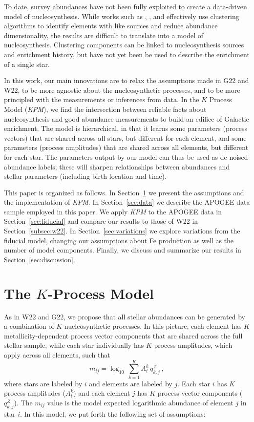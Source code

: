 \documentclass[modern]{aastex631}
\newcommand{\name}{\textsl{KPM}}
\begin{document}
To date, survey abundances have not been fully exploited to create a data-driven model of nucleosynthesis. While works such as \citet{ting2012}, \citet{casey2019}, and \citet{ratcliffe2022} effectively use clustering algorithms to identify elements with like sources and reduce abundance dimensionality, the results are difficult to translate into a model of nucleosynthesis. Clustering components can be linked to nucleosynthesis sources and enrichment history, but have not yet been be used to describe the enrichment of a single star.

In this work, our main innovations are to relax the assumptions made in G22 and W22, to be more agnostic about the nucleosynthetic processes, and to be more principled with the measurements or inferences from data.
In the $K$ Process Model (\name{}), we find the intersection between reliable facts about nucleosynthesis and good abundance measurements to build an edifice of Galactic enrichment.
The model is hierarchical, in that it learns some parameters (process vectors) that are shared across all stars, but different for each element, and some parameters (process amplitudes) that are shared across all elements, but different for each star.
The parameters output by our model can thus be used as de-noised abundance labels; these will sharpen relationships between abundances and stellar parameters (including birth location and time).

This paper is organized as follows. In Section~\ref{sec:model} we present the assumptions and the implementation of \name{}. In Section~\ref{sec:data} we describe the APOGEE data sample employed in this paper.  We apply \name{} to the APOGEE data in Section~\ref{sec:fiducial} and compare our results to those of W22 in Section~\ref{subsec:w22}. In Section~\ref{sec:variations} we explore variations from the fiducial model, changing our assumptions about Fe production as well as the number of model components. Finally, we discuss and summarize our results in Section~\ref{sec:discussion}.

\section{The $K$-Process Model}\label{sec:model}

As in W22 and G22, we propose that all stellar abundances can be generated by a combination of $K$ nucleosynthetic processes.
In this picture, each element has $K$ metallicity-dependent process vector components that are shared across the full stellar sample, while each star individually has $K$ process amplitudes, which apply across all elements, such that
\begin{equation}\label{eq:mij_k}
    m_{ij} = \log_{10} \, \sum^K_{k=1} A_i^k \, q_{k,j}^Z ~,
\end{equation}
where stars are labeled by $i$ and elements are labeled by $j$.
Each star $i$ has $K$ process amplitudes ($A^k_i$)
and each element $j$ has $K$ process vector components ($q_{k,j}^{Z}$).
The $m_{ij}$ value is the model expected logarithmic abundance of element $j$ in star $i$. In this model, we put forth the following set of assumptions:
\end{document}
